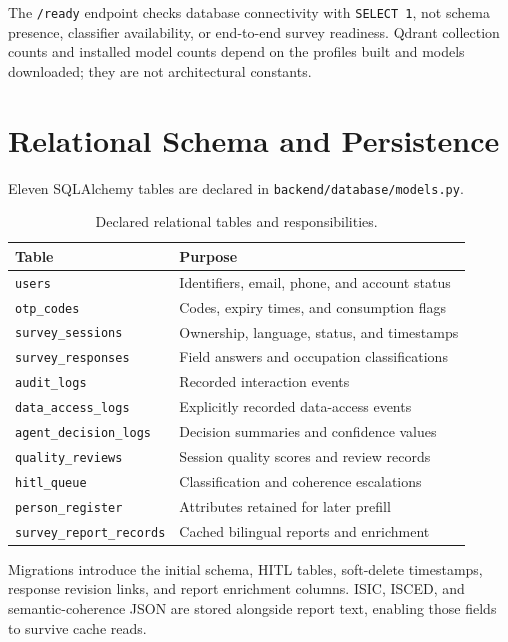 The \texttt{/ready} endpoint checks database connectivity with
\texttt{SELECT 1}, not schema presence, classifier availability, or
end-to-end survey readiness. Qdrant collection counts and installed model
counts depend on the profiles built and models downloaded; they are not
architectural constants.

\section{Relational Schema and Persistence}
\label{sec:impl-schema}

Eleven SQLAlchemy tables are declared in
\texttt{backend/database/models.py}.

\begin{table}[htbp]
\centering
\caption{Declared relational tables and responsibilities.}
\label{tab:ch4-schema}
\small
\begin{tabularx}{\textwidth}{@{}l X@{}}
\toprule
\textbf{Table} & \textbf{Purpose} \\
\midrule
\texttt{users} & Identifiers, email, phone, and account status \\
\texttt{otp\_codes} & Codes, expiry times, and consumption flags \\
\texttt{survey\_sessions} & Ownership, language, status, and timestamps \\
\texttt{survey\_responses} & Field answers and occupation classifications \\
\texttt{audit\_logs} & Recorded interaction events \\
\texttt{data\_access\_logs} & Explicitly recorded data-access events \\
\texttt{agent\_decision\_logs} & Decision summaries and confidence values \\
\texttt{quality\_reviews} & Session quality scores and review records \\
\texttt{hitl\_queue} & Classification and coherence escalations \\
\texttt{person\_register} & Attributes retained for later prefill \\
\texttt{survey\_report\_records} & Cached bilingual reports and enrichment \\
\bottomrule
\end{tabularx}
\end{table}

Migrations introduce the initial schema, HITL tables, soft-delete
timestamps, response revision links, and report enrichment columns. ISIC,
ISCED, and semantic-coherence JSON are stored alongside report text,
enabling those fields to survive cache reads.

